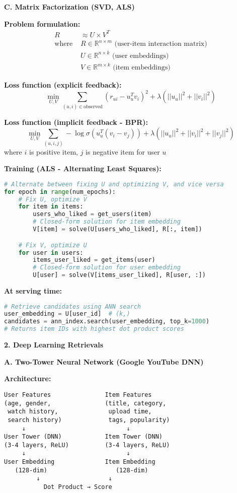 \documentclass[10pt]{article}
\begin{document}
\textbf{C. Matrix Factorization (SVD, ALS)}

\textbf{Problem formulation:}
\begin{align*}
R &\approx U \times V^T \\
\text{where } & R \in \mathbb{R}^{n \times m} \text{ (user-item interaction matrix)} \\
& U \in \mathbb{R}^{n \times k} \text{ (user embeddings)} \\
& V \in \mathbb{R}^{m \times k} \text{ (item embeddings)}
\end{align*}

\textbf{Loss function (explicit feedback):}
\begin{equation}
\min_{U,V} \sum_{(u,i) \in \text{observed}} (r_{ui} - u_u^T v_i)^2 + \lambda (||u_u||^2 + ||v_i||^2)
\end{equation}

\textbf{Loss function (implicit feedback - BPR):}
\begin{equation}
\min_{U,V} \sum_{(u,i,j)} -\log \sigma(u_u^T(v_i - v_j)) + \lambda (||u_u||^2 + ||v_i||^2 + ||v_j||^2)
\end{equation}
where $i$ is positive item, $j$ is negative item for user $u$

\textbf{Training (ALS - Alternating Least Squares):}
\begin{lstlisting}[language=Python]
# Alternate between fixing U and optimizing V, and vice versa
for epoch in range(num_epochs):
    # Fix U, optimize V
    for item in items:
        users_who_liked = get_users(item)
        # Closed-form solution for item embedding
        V[item] = solve(U[users_who_liked], R[:, item])

    # Fix V, optimize U
    for user in users:
        items_user_liked = get_items(user)
        # Closed-form solution for user embedding
        U[user] = solve(V[items_user_liked], R[user, :])
\end{lstlisting}

\textbf{At serving time:}
\begin{lstlisting}[language=Python]
# Retrieve candidates using ANN search
user_embedding = U[user_id]  # (k,)
candidates = ann_index.search(user_embedding, top_k=1000)
# Returns item IDs with highest dot product scores
\end{lstlisting}

\textbf{2. Deep Learning Retrievals}

\textbf{A. Two-Tower Neural Network (Google YouTube DNN)}

\textbf{Architecture:}
\begin{verbatim}
User Features               Item Features
(age, gender,               (title, category,
 watch history,              upload time,
 search history)             tags, popularity)
     ↓                            ↓
User Tower (DNN)            Item Tower (DNN)
(3-4 layers, ReLU)          (3-4 layers, ReLU)
     ↓                            ↓
User Embedding              Item Embedding
   (128-dim)                   (128-dim)
         ↓                   ↓
           Dot Product → Score
\end{verbatim}
\end{document}
